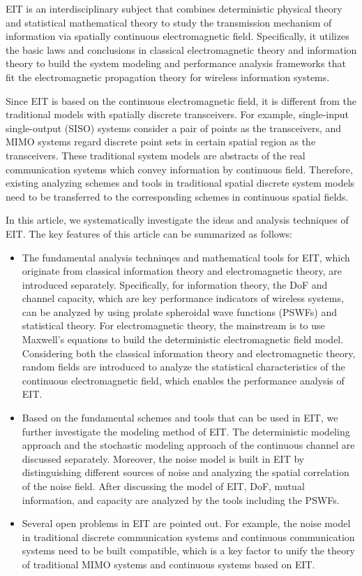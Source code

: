 \documentclass[journal,twocolumn]{IEEEtran}
\begin{document}
EIT is an interdisciplinary subject that combines deterministic physical theory and statistical mathematical theory to study the transmission mechanism of information via spatially continuous electromagnetic field. 
Specifically, it utilizes the basic laws and conclusions in classical electromagnetic theory and information theory to build the system modeling and performance analysis frameworks that fit the electromagnetic propagation theory for wireless information systems. 

Since EIT is based on the continuous electromagnetic field, it is different from the traditional models with spatially discrete transceivers. 
For example, single-input single-output (SISO) systems consider a pair of points as the transceivers, and MIMO systems regard discrete point sets in certain spatial region as the transceivers. These traditional system models are abstracts of the real communication systems which convey information by continuous field. Therefore, existing analyzing schemes and tools in traditional spatial discrete system models need to be transferred to the corresponding schemes in continuous spatial fields. 



In this article, we systematically investigate the ideas and analysis techniques of EIT. The key features of this article can be summarized as follows:
\begin{itemize}
\item{The fundamental analysis techniuqes and mathematical tools for EIT, which originate from classical information theory and electromagnetic theory, are introduced separately. Specifically, for information theory, the DoF and channel capacity, which are key performance indicators of wireless systems, can be analyzed by using prolate spheroidal wave functions (PSWFs) and statistical theory. For electromagnetic theory, the mainstream is to use Maxwell's equations to build the deterministic electromagnetic field model. Considering both the classical information theory and electromagnetic theory, random fields are introduced to analyze the statistical characteristics of the continuous electromagnetic field, which enables the performance analysis of EIT. }
\item{Based on the fundamental schemes and tools that can be used in EIT, we further investigate the modeling method of EIT. The deterministic modeling approach and the stochastic modeling approach of the continuous channel are discussed separately. Moreover, the noise model is built in EIT by distinguishing different sources of noise and analyzing the spatial correlation of the noise field. After discussing the model of EIT, DoF, mutual information, and capacity are analyzed by the tools including the PSWFs.} 
\item{Several open problems in EIT are pointed out. For example, the noise model in traditional discrete communication systems and continuous communication systems need to be built compatible, which is a key factor to unify the theory of traditional MIMO systems and continuous systems based on EIT.}
\end{itemize}
\end{document}
